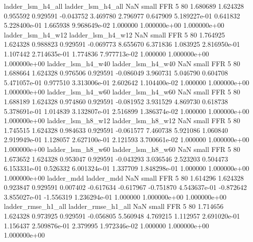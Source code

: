        ladder_lsm_h4_all        ladder_lsm_h4_all                   NaN      small      FFR                 5 80 1.680689       1.624328 0.955592       0.929591   -0.043752      3.469780      2.796977     0.647909   5.189227e-01  0.641832 5.228400e-01     1.665938   9.968649e-02            1.000000    1.000000e+00        1.000000e+00
       ladder_lsm_h4_w12        ladder_lsm_h4_w12                   NaN      small      FFR                 5 80 1.764925       1.624328 0.988823       0.929591   -0.069773      8.655670      6.371836     1.083925   2.816950e-01  1.107442 2.714635e-01     1.774836   7.977713e-02            1.000000    1.000000e+00        1.000000e+00
       ladder_lsm_h4_w40        ladder_lsm_h4_w40                   NaN      small      FFR                 5 80 1.688664       1.624328 0.976506       0.929591   -0.086049      3.960731      5.046790     0.604708   5.471057e-01  0.977510 3.313006e-01     2.602642   1.104400e-02            1.000000    1.000000e+00        1.000000e+00
       ladder_lsm_h4_w60        ladder_lsm_h4_w60                   NaN      small      FFR                 5 80 1.688189       1.624328 0.974860       0.929591   -0.081952      3.931529      4.869730     0.618738   5.378691e-01  1.014839 3.132807e-01     2.516899   1.386374e-02            1.000000    1.000000e+00        1.000000e+00
       ladder_lsm_h8_w12        ladder_lsm_h8_w12                   NaN      small      FFR                 5 80 1.745515       1.624328 0.984633       0.929591   -0.061577      7.460738      5.921086     1.060840   2.919949e-01  1.128057 2.627100e-01     2.121593   3.700661e-02            1.000000    1.000000e+00        1.000000e+00
       ladder_lsm_h8_w60        ladder_lsm_h8_w60                   NaN      small      FFR                 5 80 1.673652       1.624328 0.953047       0.929591   -0.043293      3.036546      2.523203     0.504473   6.153331e-01  0.526332 6.001324e-01     1.337709   1.848298e-01            1.000000    1.000000e+00        1.000000e+00
              ladder_mdd               ladder_mdd                   NaN      small      FFR                 5 80 1.614296       1.624328 0.923847       0.929591    0.007402     -0.617634     -0.617967    -0.751870   4.543637e-01 -0.872642 3.855027e-01    -1.556319   1.236294e-01            1.000000    1.000000e+00        1.000000e+00
      ladder_rmse_h1_all       ladder_rmse_h1_all                   NaN      small      FFR                 5 80 1.714656       1.624328 0.973925       0.929591   -0.056805      5.560948      4.769215     1.112957   2.691020e-01  1.156437 2.509876e-01     2.379995   1.972346e-02            1.000000    1.000000e+00        1.000000e+00
